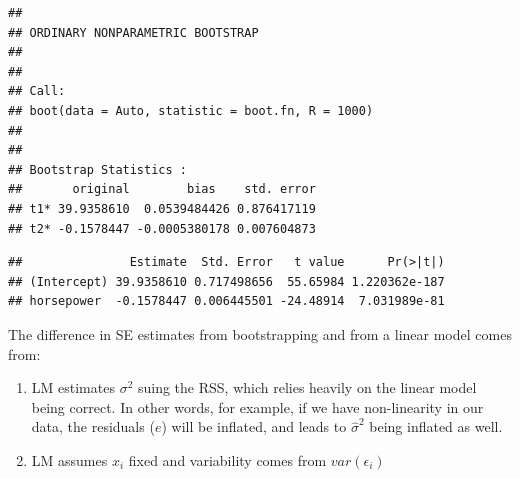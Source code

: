 \documentclass[
]{book}
\newenvironment{Shaded}{\begin{snugshade}}{\end{snugshade}}
\newcommand{\AttributeTok}[1]{\textcolor[rgb]{0.77,0.63,0.00}{#1}}
\newcommand{\CommentTok}[1]{\textcolor[rgb]{0.56,0.35,0.01}{\textit{#1}}}
\newcommand{\FunctionTok}[1]{\textcolor[rgb]{0.00,0.00,0.00}{#1}}
\newcommand{\NormalTok}[1]{#1}
\newcommand{\SpecialCharTok}[1]{\textcolor[rgb]{0.00,0.00,0.00}{#1}}
\providecommand{\tightlist}{%
  \setlength{\itemsep}{0pt}\setlength{\parskip}{0pt}}
\begin{document}
\begin{verbatim}
## 
## ORDINARY NONPARAMETRIC BOOTSTRAP
## 
## 
## Call:
## boot(data = Auto, statistic = boot.fn, R = 1000)
## 
## 
## Bootstrap Statistics :
##       original        bias    std. error
## t1* 39.9358610  0.0539484426 0.876417119
## t2* -0.1578447 -0.0005380178 0.007604873
\end{verbatim}

\begin{Shaded}
\end{Shaded}

\begin{verbatim}
##               Estimate  Std. Error   t value      Pr(>|t|)
## (Intercept) 39.9358610 0.717498656  55.65984 1.220362e-187
## horsepower  -0.1578447 0.006445501 -24.48914  7.031989e-81
\end{verbatim}

\begin{Shaded}
\end{Shaded}

The difference in SE estimates from bootstrapping and from a linear model comes from:

\begin{enumerate}
\def\labelenumi{\arabic{enumi}.}
\tightlist
\item
  LM estimates \(\sigma^2\) suing the RSS, which relies heavily on the linear model being correct. In other words, for example, if we have non-linearity in our data, the residuals (\(e\)) will be inflated, and leads to \(\hat{\sigma}^2\) being inflated as well.
\item
  LM assumes \(x_i\) fixed and variability comes from \(var(\epsilon_i)\)
\end{enumerate}
\end{document}
